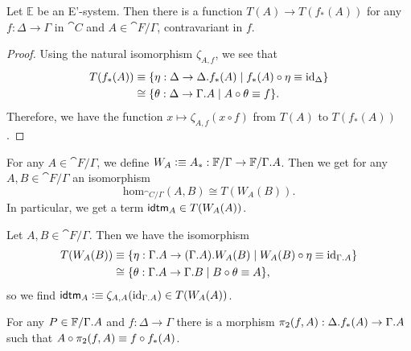\begin{lem}\label{lem:ptm}
Let $\mathbb{E}$ be an E'-system. Then there is a function $T(A)\to T(f_\ast(A))$
for any $f:\Delta\to\Gamma$ in $\cat{C}$ and $A\in\cat{F}/\Gamma$, contravariant
in $f$. 
\end{lem}

\begin{proof}
Using the natural isomorphism $\zeta_{A,f}$, we see that
\begin{align*}
T(f_\ast(A)) & \jdeq \{\eta : \Delta\to\ctxext{\Delta}{f_\ast(A)}\mid f_\ast(A)\circ\eta\jdeq\catid{\Delta}\}
  \\
  & \cong
\{\theta : \Delta\to \ctxext{\Gamma}{A}\mid A\circ\theta\jdeq f\}.
\end{align*}
Therefore, we have the function $x\mapsto \zeta_{A,f}(x\circ f)$ from $T(A)$ to
$T(f_\ast(A))$. 
\end{proof}

\begin{defn}
For any $A\in\cat{F}/\Gamma$, we define
$W_A\defeq A_\ast:\cat{F}/\Gamma\to\cat{F}/\ctxext{\Gamma}{A}$. Then we get
for any $A,B\in\cat{F}/\Gamma$ an isomorphism
\begin{equation*}
\mathrm{hom}_{\cat{C}/\Gamma}(A,B)
  \cong
T(W_A(B)).
\end{equation*}
In particular, we get a term $\idtm{A}\in T(W_A(A))$. 
\end{defn}

\begin{constr}
Let $A,B\in\cat{F}/\Gamma$. Then we have the isomorphism
\begin{align*}
T(W_A(B)) & \jdeq \{\eta:\ctxext{\Gamma}{A}\to\ctxext{{\Gamma}{A}}{W_A(B)}\mid W_A(B)\circ\eta\jdeq\catid{\ctxext{\Gamma}{A}}\} \\
  & \cong
\{\theta:\ctxext{\Gamma}{A}\to\ctxext{\Gamma}{B}\mid B\circ\theta\jdeq A\},
\end{align*}
so we find $\idtm{A}\defeq\zeta_{A,A}(\catid{\ctxext{\Gamma}{A}})\in T(W_A(A))$.
\end{constr}

\begin{defn}
For any $P\in\cat{F}/\ctxext{\Gamma}{A}$ and $f:\Delta\to\Gamma$ 
there is a morphism $\pi_2(f,A):\ctxext{\Delta}{f_\ast(A)}\to\ctxext{\Gamma}{A}$
such that $A\circ \pi_2(f,A)\equiv f\circ f_\ast(A)$.
\end{defn}

